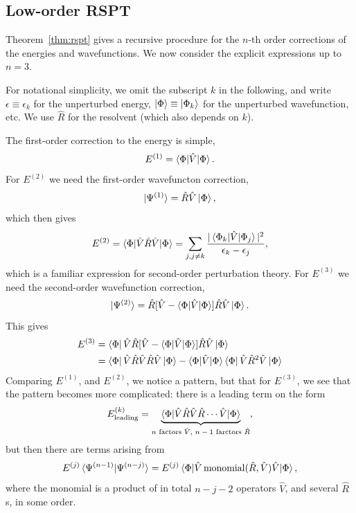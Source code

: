 \documentclass{report}
\theoremstyle{plain}
\theoremstyle{definition}
\begin{document}
\subsection{Low-order RSPT}

Theorem~\ref{thm:rspt} gives a recursive procedure for the $n$-th
order corrections of the energies and wavefunctions. We now consider
the explicit expressions up to $n=3$.

For notational simplicity, we omit the subscript $k$ in the
following, and write $\epsilon \equiv \epsilon_k$ for the unperturbed
energy, $\ket{\Phi}\equiv\ket{\Phi_k}$ for the unperturbed
wavefunction, etc. We use $\hat{R}$ for the resolvent (which also
depends on $k$).

The first-order correction to the energy is simple,
\begin{equation}
  E^{(1)} = \braket{\Phi|\hat{V}|\Phi}.
\end{equation}
For $E^{(2)}$ we need the first-order wavefuncton correction,
\begin{equation}
  \ket{\Psi^{(1)}} = \hat{R} \hat{V} \ket{\Phi},
\end{equation}
which then gives
\begin{equation}
  E^{(2)} = \braket{\Phi|\hat{V}\hat{R}\hat{V} |\Phi} = \sum_{j, j\neq
    k} \frac{|\braket{\Phi_k|\hat{V}|\Phi_j}|^2}{\epsilon_k - \epsilon_j},
\end{equation}
which is a familiar expression for second-order perturbation theory.
For $E^{(3)}$ we need the second-order wavefunction correction,
\begin{equation}
  \ket{\Psi^{(2)}} = \hat{R} [\hat{V} -
  \braket{\Phi|\hat{V}|\Phi}] \hat{R}
  \hat{V} \ket{\Phi}. \label{eq:second-order-psi}
\end{equation}
This gives
\begin{equation}
  \begin{split}
    E^{(3)} &= \bra{\Phi}\hat{V}\hat{R}
    [\hat{V} - \braket{\Phi|\hat{V}|\Phi}] \hat{R} \hat{V} \ket{\Phi} 
    \\
    &= \bra{\Phi}\hat{V}\hat{R} \hat{V}
    \hat{R} \hat{V} \ket{\Phi} -
    \braket{\Phi|\hat{V}|\Phi}
    \bra{\Phi}\hat{V}\hat{R}^2 \hat{V}
    \ket{\Phi} 
    \label{eq:third-order-e}
  \end{split}   
\end{equation}
Comparing $E^{(1)}$, and $E^{(2)}$, we notice a pattern, but that for $E^{(3)}$, we see that the
pattern becomes more complicated: there is a leading term on the form
\begin{equation}
  E^{(k)}_\text{leading} =
  \underbrace{\braket{\Phi|\hat{V}\hat{R}\hat{V}\hat{R}\cdots\hat{V}|\Phi}}_{\text{$n$
      factors $\hat{V}$, $n-1$ farctors $\hat{R}$}},
\end{equation}
but then there are terms arising from
\begin{equation}
  E^{(j)}\braket{\Psi^{(n-1)}|\Psi^{(n-j)}} = E^{(j)} \braket{\Phi|\hat{V}
    \operatorname{monomial}(\hat{R},\hat{V}) \hat{V}|\Phi},
\end{equation}
where the monomial is a product of in total $n-j-2$ operators $\hat{V}$,
and several $\hat{R}$s, in some order.
\end{document}
